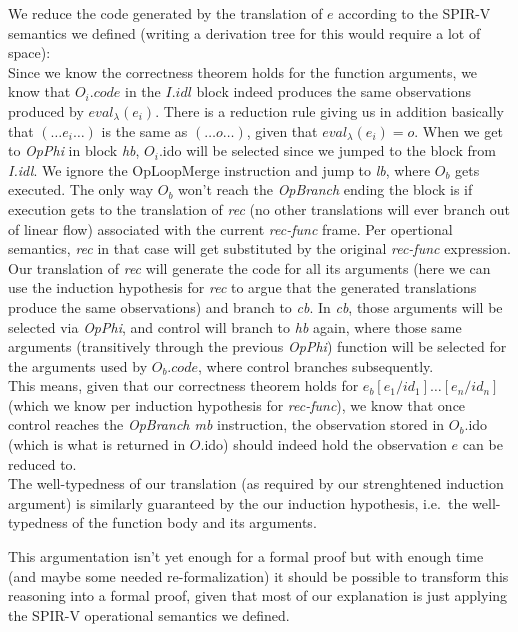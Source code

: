 \documentclass[letterpaper,12pt]{article}
\begin{document}
We reduce the code generated by the translation of $e$ according
to the SPIR-V semantics we defined (writing a derivation
tree for this would require a lot of space): \\
Since we know the correctness theorem holds for the function arguments, 
we know that $O_i.code$ in the $I.idl$ block indeed produces the same observations produced by
$eval_\lambda(e_i)$. There is a reduction rule giving us in
addition basically that $(\dots e_i \dots)$ is the same as
$(\dots o \dots)$, given that $eval_\lambda(e_i) = o$.
When we get to \textit{OpPhi} in block \textit{hb},
$O_i$.ido will be selected since we jumped to the block from \textit{I.idl}.
We ignore the OpLoopMerge instruction and jump to \textit{lb},
where $O_b$ gets executed. The only way $O_b$ won't reach
the \textit{OpBranch} ending the block is if execution gets to the
translation of \textit{rec} (no other translations will ever branch out of
linear flow) associated with the current \textit{rec-func} frame.
Per opertional semantics, \textit{rec} in that case will get substituted 
by the original \textit{rec-func} expression. \\
Our translation of \textit{rec} will
generate the code for all its arguments (here we can use the
induction hypothesis for \textit{rec} to argue that the generated translations
produce the same observations) and branch to \textit{cb}. In \textit{cb},
those arguments will be selected via \textit{OpPhi}, and control
will branch to \textit{hb} again, where those same arguments
(transitively through the previous \textit{OpPhi}) function will
be selected for the arguments used by $O_b.code$, where control
branches subsequently. \\
This means, given that our correctness theorem holds for
$e_b[e_1 / id_1]\dots[e_n / id_n]$ (which we know per induction
hypothesis for \textit{rec-func}), we know that once control reaches
the \textit{OpBranch mb} instruction, the observation stored in
$O_b$.ido (which is what is returned in $O$.ido) should indeed
hold the observation $e$ can be reduced to. \\
The well-typedness of our translation (as required by our strenghtened
induction argument) is similarly guaranteed by the our induction
hypothesis, i.e.\ the well-typedness of the function body and its
arguments.

This argumentation isn't yet enough for a formal proof but with
enough time (and maybe some needed re-formalization) it should
be possible to transform this reasoning into a formal proof,
given that most of our explanation is just applying the SPIR-V operational
semantics we defined.
\end{document}
